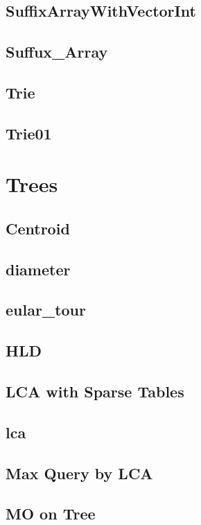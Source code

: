 ﻿\documentclass[10pt,twocolumn]{article}
\newcommand{\codefile}[1]{}}
\begin{document}
\subsection{SuffixArrayWithVectorInt}
\codefile{Strings/SuffixArrayWithVectorInt.cpp}

\subsection{Suffux\_Array}
\codefile{Strings/Suffux_Array.cpp}

\subsection{Trie}
\codefile{Strings/Trie.cpp}

\subsection{Trie01}
\codefile{Strings/Trie01.cpp}

\section{Trees}
\subsection{Centroid}
\codefile{Tree/Centroid.cpp}

\subsection{diameter}
\codefile{Tree/diameter.cpp}

\subsection{eular\_tour}
\codefile{Tree/eular_tour.cpp}

\subsection{HLD}
\codefile{Tree/HLD.cpp}

\subsection{LCA with Sparse Tables}
\codefile{Tree/LCA with Sparse Tables.cpp}

\subsection{lca}
\codefile{Tree/lca.cpp}

\subsection{Max Query by LCA}
\codefile{Tree/Max Query by LCA.cpp}

\subsection{MO on Tree}
\codefile{Tree/MO on Tree.cpp}
\end{document}
